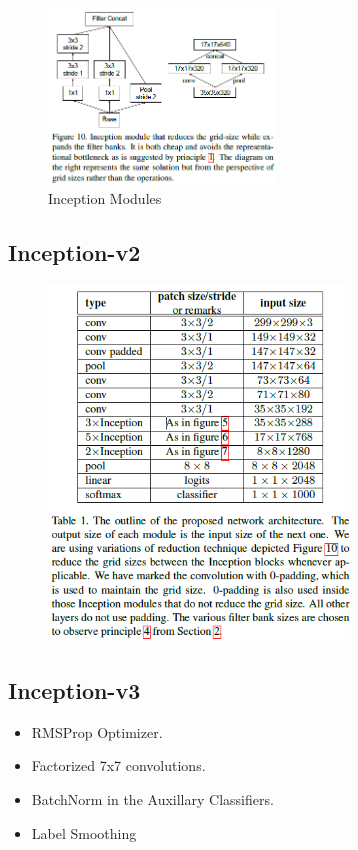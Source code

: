 \begin{figure}[htbp]
    \hspace{1in}
    \includegraphics[width=6cm]{images/models/inception_m4.png}
    \caption{Inception Modules}
\end{figure}

\subsection{Inception-v2}
\begin{figure}[H]
    \centering
    \includegraphics[width=8cm]{images/models/inception_v2v3.png}
    \label{fig:inception_v2v3}
\end{figure}

\subsection{Inception-v3}
\begin{itemize}
    \item RMSProp Optimizer.
    \item Factorized 7x7 convolutions.
    \item BatchNorm in the Auxillary Classifiers.
    \item Label Smoothing
\end{itemize}

